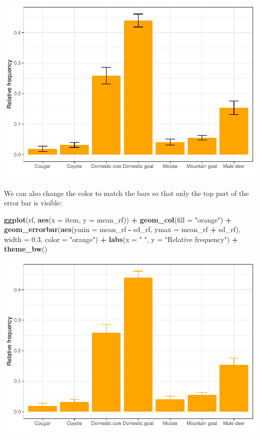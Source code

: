 \documentclass[
]{book}
\newenvironment{Shaded}{\begin{snugshade}}{\end{snugshade}}
\newcommand{\AttributeTok}[1]{\textcolor[rgb]{0.13,0.29,0.53}{#1}}
\newcommand{\FloatTok}[1]{\textcolor[rgb]{0.00,0.00,0.81}{#1}}
\newcommand{\FunctionTok}[1]{\textcolor[rgb]{0.13,0.29,0.53}{\textbf{#1}}}
\newcommand{\NormalTok}[1]{#1}
\newcommand{\SpecialCharTok}[1]{\textcolor[rgb]{0.81,0.36,0.00}{\textbf{#1}}}
\newcommand{\StringTok}[1]{\textcolor[rgb]{0.31,0.60,0.02}{#1}}
\begin{document}
\includegraphics{reproducible-science_files/figure-latex/gg27-1.pdf}

We can also change the color to match the bars so that only the top part of the
error bar is visible:

\begin{Shaded}
\begin{Highlighting}[]
\FunctionTok{ggplot}\NormalTok{(rf, }\FunctionTok{aes}\NormalTok{(}\AttributeTok{x =}\NormalTok{ item, }\AttributeTok{y =}\NormalTok{ mean\_rf)) }\SpecialCharTok{+}
  \FunctionTok{geom\_col}\NormalTok{(}\AttributeTok{fill =} \StringTok{"orange"}\NormalTok{) }\SpecialCharTok{+} 
  \FunctionTok{geom\_errorbar}\NormalTok{(}\FunctionTok{aes}\NormalTok{(}\AttributeTok{ymin =}\NormalTok{ mean\_rf }\SpecialCharTok{{-}}\NormalTok{ sd\_rf,}
                    \AttributeTok{ymax =}\NormalTok{ mean\_rf }\SpecialCharTok{+}\NormalTok{ sd\_rf),}
                \AttributeTok{width =} \FloatTok{0.3}\NormalTok{,}
                \AttributeTok{color =} \StringTok{"orange"}\NormalTok{) }\SpecialCharTok{+}
  \FunctionTok{labs}\NormalTok{(}\AttributeTok{x =} \StringTok{" "}\NormalTok{, }\AttributeTok{y =} \StringTok{"Relative frequency"}\NormalTok{) }\SpecialCharTok{+}
  \FunctionTok{theme\_bw}\NormalTok{()}
\end{Highlighting}
\end{Shaded}

\includegraphics{reproducible-science_files/figure-latex/gg28-1.pdf}
\end{document}
